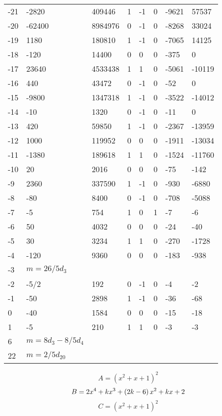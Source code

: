 \documentclass{amsart}
\begin{document}
\begin{longtable}{|l|l|l|lllll|}
-21&-2820&409446&1&-1&0&-9621&57537\\
-20&-62400&8984976&0&-1&0&-8268&33024\\
-19&1180&180810&1&-1&0&-7065&14125\\
-18&-120&14400&0&0&0&-375&0\\
-17&23640&4533438&1&1&0&-5061&-10119\\
-16&440&43472&0&-1&0&-52&0\\
-15&-9800&1347318&1&-1&0&-3522&-14012\\
-14&-10&1320&0&-1&0&-11&0\\
-13&420&59850&1&-1&0&-2367&-13959\\
-12&1000&119952&0&0&0&-1911&-13034\\
-11&-1380&189618&1&1&0&-1524&-11760\\
-10&20&2016&0&0&0&-75&-142\\
-9&2360&337590&1&-1&0&-930&-6880\\
-8&-80&8400&0&-1&0&-708&-5088\\
-7&-5&754&1&0&1&-7&-6\\
-6&50&4032&0&0&0&-24&-40\\
-5&30&3234&1&1&0&-270&-1728\\
-4&-120&9360&0&0&0&-183&-938\\
-3&$m=26/5d_{3}$&&\multicolumn{5}{c|}{}\\
-2&-5/2&192&0&-1&0&-4&-2\\
-1&-50&2898&1&-1&0&-36&-68\\
0&-40&1584&0&0&0&-15&-18\\
1&-5&210&1&1&0&-3&-3\\
6&$m=8d_{3}-8/5d_{4}$&&\multicolumn{5}{c|}{}\\
22&$m=2/5d_{20}$&&\multicolumn{5}{c|}{}\\
\hline
\end{longtable}
$$A=(x^2
 + x
 + 1)^{2}$$
$$B=2\*x^4
 + k\*x^3
 + \left(2\*k
 - 6\right) \*x^2
 + k\*x
 + 2$$
$$C=(x^2
 + x
 + 1)^{2}$$
\end{document}
